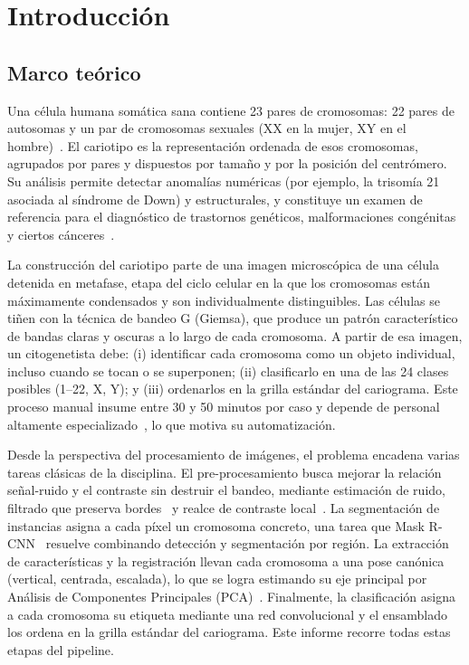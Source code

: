 \documentclass[11pt,a4paper]{article}
\begin{document}
\section{Introducción}

\subsection{Marco teórico}

Una célula humana somática sana contiene 23 pares de cromosomas: 22 pares de
autosomas y un par de cromosomas sexuales (XX en la mujer, XY en el
hombre)~\cite{you2023autokary}. El cariotipo es la representación ordenada
de esos cromosomas, agrupados por pares y dispuestos por tamaño y por la posición
del centrómero. Su análisis permite detectar anomalías numéricas (por ejemplo, la
trisomía 21 asociada al síndrome de Down) y estructurales, y constituye un examen
de referencia para el diagnóstico de trastornos genéticos, malformaciones
congénitas y ciertos cánceres~\cite{wang2024fully}.

La construcción del cariotipo parte de una imagen microscópica de una célula
detenida en metafase, etapa del ciclo celular en la que los cromosomas
están máximamente condensados y son individualmente distinguibles. Las células se
tiñen con la técnica de bandeo G (Giemsa), que produce un patrón
característico de bandas claras y oscuras a lo largo de cada cromosoma. A partir de
esa imagen, un citogenetista debe: (i) identificar cada cromosoma como un objeto
individual, incluso cuando se tocan o se superponen; (ii) clasificarlo en una de
las 24 clases posibles (1--22, X, Y); y (iii) ordenarlos en la grilla estándar del
cariograma. Este proceso manual insume entre 30 y 50 minutos por caso y depende de
personal altamente especializado~\cite{you2023autokary,wang2024fully}, lo que
motiva su automatización.

Desde la perspectiva del procesamiento de imágenes, el problema encadena varias
tareas clásicas de la disciplina. El pre-procesamiento busca mejorar la
relación señal-ruido y el contraste sin destruir el bandeo, mediante estimación de
ruido, filtrado que preserva bordes~\cite{buades2005nlm} y realce de contraste
local~\cite{zuiderveld1994clahe}. La segmentación de instancias asigna a
cada píxel un cromosoma concreto, una tarea que Mask R-CNN~\cite{he2017maskrcnn}
resuelve combinando detección y segmentación por región. La extracción de
características y la registración llevan cada cromosoma a una pose canónica
(vertical, centrada, escalada), lo que se logra estimando su eje principal por
Análisis de Componentes Principales (PCA)~\cite{jolliffe2016pca}. Finalmente, la
clasificación asigna a cada cromosoma su etiqueta mediante una red convolucional y
el ensamblado los ordena en la grilla estándar del cariograma. Este informe recorre
todas estas etapas del pipeline.
\end{document}
